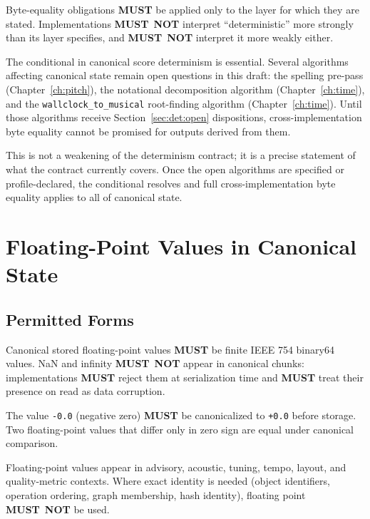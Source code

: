 \documentclass[11pt,letterpaper]{report}
\newcounter{requirement}[chapter]
\newcommand{\MUST}{\textbf{MUST}}
\newcommand{\MUSTNOT}{\textbf{MUST}\nobreak\ \textbf{NOT}}
\begin{document}
\begin{requirement}
  \label{req:determinism:determinism-layer-scope}
  Byte-equality obligations \MUST{} be applied only to the layer
  for which they are stated. Implementations \MUSTNOT{} interpret
  ``deterministic'' more strongly than its layer specifies, and
  \MUSTNOT{} interpret it more weakly either.
\end{requirement}

\begin{rationale}
  The conditional in canonical score determinism is essential.
  Several algorithms affecting canonical state remain open
  questions in this draft: the spelling pre-pass
  (Chapter~\ref{ch:pitch}), the notational decomposition
  algorithm (Chapter~\ref{ch:time}), and the
  \texttt{wallclock\_to\_musical} root-finding algorithm
  (Chapter~\ref{ch:time}). Until those algorithms receive
  Section~\ref{sec:det:open} dispositions, cross-implementation
  byte equality cannot be promised for outputs derived from them.

  This is not a weakening of the determinism contract; it is a
  precise statement of what the contract currently covers. Once
  the open algorithms are specified or profile-declared, the
  conditional resolves and full cross-implementation byte
  equality applies to all of canonical state.
\end{rationale}

\section{Floating-Point Values in Canonical State}
\label{sec:det:fp}

\subsection{Permitted Forms}

\begin{requirement}
  \label{req:determinism:canonical-floating-point}
  Canonical stored floating-point values \MUST{} be finite
  IEEE 754 binary64 values. NaN and infinity \MUSTNOT{} appear
  in canonical chunks: implementations \MUST{} reject them at
  serialization time and \MUST{} treat their presence on read as
  data corruption.

  The value \texttt{-0.0} (negative zero) \MUST{} be canonicalized
  to \texttt{+0.0} before storage. Two floating-point values that
  differ only in zero sign are equal under canonical comparison.

  Floating-point values appear in advisory, acoustic, tuning,
  tempo, layout, and quality-metric contexts. Where exact
  identity is needed (object identifiers, operation ordering,
  graph membership, hash identity), floating point \MUSTNOT{}
  be used.
\end{requirement}
\end{document}
